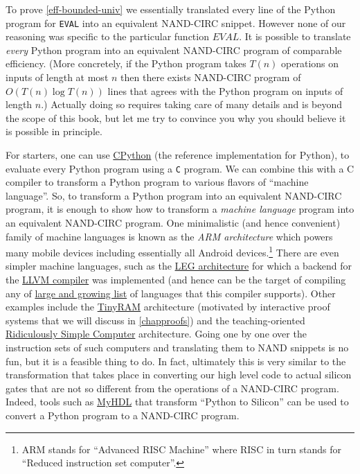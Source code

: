 To prove \cref{eff-bounded-univ} we essentially translated every line of
the Python program for \texttt{EVAL} into an equivalent NAND-CIRC
snippet. However none of our reasoning was specific to the particular
function \(\ensuremath{\mathit{EVAL}}\). It is possible to translate
\emph{every} Python program into an equivalent NAND-CIRC program of
comparable efficiency. (More concretely, if the Python program takes
\(T(n)\) operations on inputs of length at most \(n\) then there exists
NAND-CIRC program of \(O(T(n) \log T(n))\) lines that agrees with the
Python program on inputs of length \(n\).) Actually doing so requires
taking care of many details and is beyond the scope of this book, but
let me try to convince you why you should believe it is possible in
principle.

For starters, one can use
\href{https://en.wikipedia.org/wiki/CPython}{CPython} (the reference
implementation for Python), to evaluate every Python program using a
\texttt{C} program. We can combine this with a C compiler to transform a
Python program to various flavors of ``machine language''. So, to
transform a Python program into an equivalent NAND-CIRC program, it is
enough to show how to transform a \emph{machine language} program into
an equivalent NAND-CIRC program. One minimalistic (and hence convenient)
family of machine languages is known as the \emph{ARM architecture}
which powers many mobile devices including essentially all Android
devices.\footnote{ARM stands for ``Advanced RISC Machine'' where RISC in
  turn stands for ``Reduced instruction set computer''.} There are even
simpler machine languages, such as the
\href{https://github.com/frasercrmck/llvm-leg}{LEG architecture} for
which a backend for the \href{http://llvm.org/}{LLVM compiler} was
implemented (and hence can be the target of compiling any of
\href{https://en.wikipedia.org/wiki/LLVM\#Front_ends}{large and growing
list} of languages that this compiler supports). Other examples include
the \href{http://www.scipr-lab.org/doc/TinyRAM-spec-0.991.pdf}{TinyRAM}
architecture (motivated by interactive proof systems that we will
discuss in \cref{chapproofs}) and the teaching-oriented
\href{https://www.ece.umd.edu/~blj/RiSC/}{Ridiculously Simple Computer}
architecture. Going one by one over the instruction sets of such
computers and translating them to NAND snippets is no fun, but it is a
feasible thing to do. In fact, ultimately this is very similar to the
transformation that takes place in converting our high level code to
actual silicon gates that are not so different from the operations of a
NAND-CIRC program. Indeed, tools such as
\href{http://www.myhdl.org/}{MyHDL} that transform ``Python to Silicon''
can be used to convert a Python program to a NAND-CIRC program.

